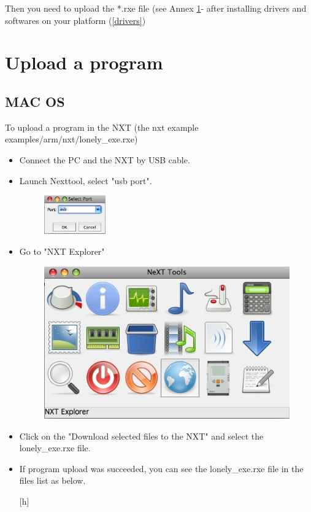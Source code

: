Then you need to upload the *.rxe file (see Annex \ref{uploadprogram}- after installing drivers and softwares on your platform (\ref{drivers})

\section{Upload a program} \label{uploadprogram}
\subsection{MAC OS}
To upload a program in the NXT (the nxt example examples/arm/nxt/lonely\_exe.rxe)
\begin{itemize}
\item Connect the PC and the NXT by USB cable.
\item Launch Nexttool, select "usb port".
	\begin{figure}[htbp] %
   		\centering
		\includegraphics[width=0.25\textwidth]{pictures/usbport.jpg}
	\end{figure}
\item Go to "NXT Explorer"
	\begin{figure}[htbp] %
   		\centering
		\includegraphics[width=.7\textwidth]{pictures/nxtexplorer.jpg}
	\end{figure}
\item Click on the "Download selected files to the NXT" and select the lonely\_exe.rxe file.
\item If program upload was succeeded, you can see the lonely\_exe.rxe file in the files list as below.
	\begin{center}[h] %

\end{center}
\end{itemize}
